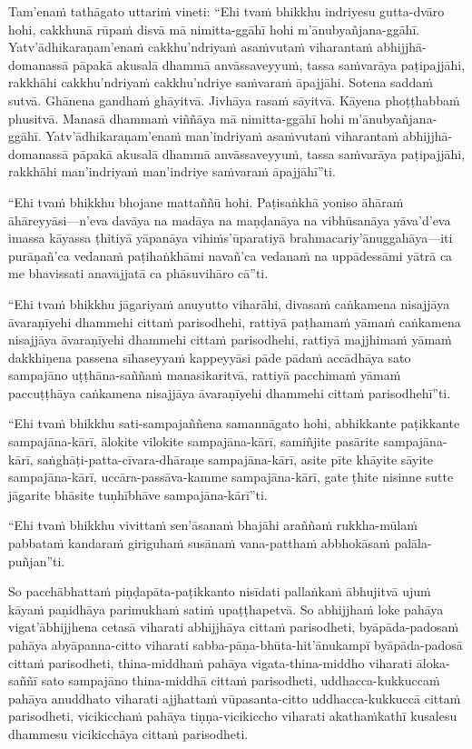 Tam'enaṁ tathāgato uttariṁ vineti: ``Ehi tvaṁ bhikkhu indriyesu gutta-dvāro hohi, cakkhunā rūpaṁ disvā mā nimitta-ggāhī hohi m'ānubyañjana-ggāhī. Yatv'ādhikaraṇam'enaṁ cakkhu'ndriyaṁ asaṁvutaṁ viharantaṁ abhijjhā-domanassā pāpakā akusalā dhammā anvāssaveyyuṁ, tassa saṁvarāya paṭipajjāhi, rakkhāhi cakkhu'ndriyaṁ cakkhu'ndriye saṁvaraṁ āpajjāhi. Sotena saddaṁ sutvā. Ghānena gandhaṁ ghāyitvā. Jivhāya rasaṁ sāyitvā. Kāyena phoṭṭhabbaṁ phusitvā. Manasā dhammaṁ viññāya mā nimitta-ggāhī hohi m'ānubyañjana-ggāhī. Yatv'ādhikaraṇam'enaṁ man'indriyaṁ asaṁvutaṁ viharantaṁ abhijjhā-domanassā pāpakā akusalā dhammā anvāssaveyyuṁ, tassa saṁvarāya paṭipajjāhi, rakkhāhi man'indriyaṁ man'indriye saṁvaraṁ āpajjāhī''ti.

``Ehi tvaṁ bhikkhu bhojane mattaññū hohi. Paṭisaṅkhā yoniso āhāraṁ āhāreyyāsi—n'eva davāya na madāya na maṇḍanāya na vibhūsanāya yāva'd'eva imassa kāyassa ṭhitiyā yāpanāya vihiṁs'ūparatiyā brahmacariy'ānuggahāya—iti purāṇañ'ca vedanaṁ paṭihaṅkhāmi navañ'ca vedanaṁ na uppādessāmi yātrā ca me bhavissati anavajjatā ca phāsuvihāro cā''ti.

``Ehi tvaṁ bhikkhu jāgariyaṁ anuyutto viharāhi, divasaṁ caṅkamena nisajjāya āvaraṇīyehi dhammehi cittaṁ parisodhehi, rattiyā paṭhamaṁ yāmaṁ caṅkamena nisajjāya āvaraṇīyehi dhammehi cittaṁ parisodhehi, rattiyā majjhimaṁ yāmaṁ dakkhiṇena passena sīhaseyyaṁ kappeyyāsi pāde pādaṁ accādhāya sato sampajāno uṭṭhāna-saññaṁ manasikaritvā, rattiyā pacchimaṁ yāmaṁ paccuṭṭhāya caṅkamena nisajjāya āvaraṇīyehi dhammehi cittaṁ parisodhehī''ti.

``Ehi tvaṁ bhikkhu sati-sampajaññena samannāgato hohi, abhikkante paṭikkante sampajāna-kārī, ālokite vilokite sampajāna-kārī, samiñjite pasārite sampajāna-kārī, saṅghāṭi-patta-cīvara-dhāraṇe sampajāna-kārī, asite pīte khāyite sāyite sampajāna-kārī, uccāra-passāva-kamme sampajāna-kārī, gate ṭhite nisinne sutte jāgarite bhāsite tuṇhībhāve sampajāna-kārī''ti.

\ifbfive\clearpage\fi

``Ehi tvaṁ bhikkhu vivittaṁ sen'āsanaṁ bhajāhi araññaṁ rukkha-mūlaṁ pabbataṁ kandaraṁ giriguhaṁ susānaṁ vana-patthaṁ abbhokāsaṁ palāla-puñjan''ti.

So pacchābhattaṁ piṇḍapāta-paṭikkanto nisīdati pallaṅkaṁ ābhujitvā ujuṁ kāyaṁ paṇidhāya parimukhaṁ satiṁ upaṭṭhapetvā. So abhijjhaṁ loke pahāya vigat'ābhijjhena cetasā viharati abhijjhāya cittaṁ parisodheti, byāpāda-padosaṁ pahāya abyāpanna-citto viharati sabba-pāṇa-bhūta-hit'ānukampī byāpāda-padosā cittaṁ parisodheti, thina-middhaṁ pahāya vigata-thina-middho viharati āloka-saññī sato sampajāno thina-middhā cittaṁ parisodheti, uddhacca-kukkuccaṁ pahāya anuddhato viharati ajjhattaṁ vūpasanta-citto uddhacca-kukkuccā cittaṁ parisodheti, vicikicchaṁ pahāya tiṇṇa-vicikiccho viharati akathaṁkathī kusalesu dhammesu vicikicchāya cittaṁ parisodheti.

